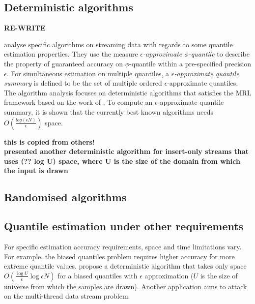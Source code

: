 \subsection{Deterministic algorithms}
\label{deterministic}
\textbf{RE-WRITE } 

\citeauthor{greenwaldQuantilesEquidepthHistograms2016a}\cite{greenwaldQuantilesEquidepthHistograms2016a} analyse specific algorithms on streaming data with regards to some quantile estimation properties. 
They use the measure \textit{$\epsilon$-approximate $\phi$-quantile} to describe the property of guaranteed accuracy on $\phi$-quantile within a pre-specified precision $\epsilon$. 
For simultaneous estimation on multiple quantiles, a \textit{$\epsilon$-approximate quantile summary} is defined to be the set of multiple ordered $\epsilon$-approximate quantiles.
The algorithm analysis focuses on deterministic algorithms that satisfies the MRL framework based on the work of \citeauthor{mankuApproximateMediansOthera} \cite{mankuApproximateMediansOthera}. To compute an $\epsilon$-approximate quantile summary, it is shown that the currently best known algorithms needs $O(\frac{log(\epsilon N)} {\epsilon})$ space.

\textbf{ this is copied from others!\\
    \citeauthor{shrivastavaMediansNewAggregation2004} \cite{shrivastavaMediansNewAggregation2004}
        presented another deterministic algorithm for insert-only streams that uses (?? log U) space, where U is the size of the domain from which the input is drawn
    }


\subsection{Randomised algorithms}
\label{randomised}
\cite{guhaStreamOrderOrder2009}


\subsection{Quantile estimation under other requirements}
\label{other}
For specific estimation accuracy requirements, space and time limitations vary. For example, the biased quantiles problem requires higher accuracy for more extreme quantile values. \citeauthor{cormodeSpaceTimeefficientDeterministic2006} \cite{cormodeSpaceTimeefficientDeterministic2006} propose a deterministic algorithm that takes only space $O(\frac{\log {U}}{\epsilon} \log {\epsilon N})$ for a biased quantiles with $\epsilon$ approximation ($U$ is the size of universe from which the samples are drawn). 
Another application aims to attack on the multi-thread data stream problem. \cite{ben-haimStreamingParallelDecision} 

